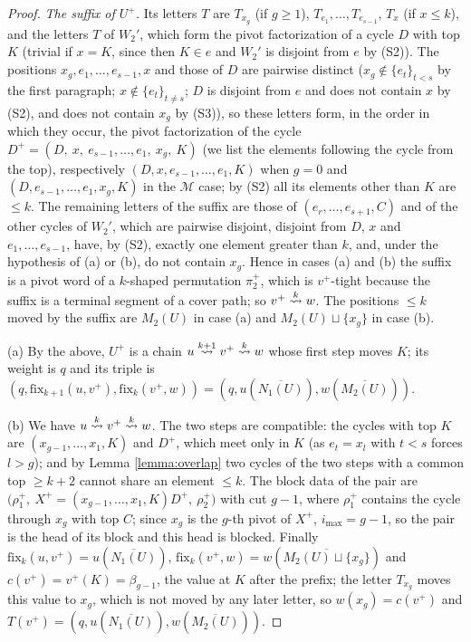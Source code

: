 \documentclass{amsart}
\theoremstyle{definition}
\theoremstyle{remark}
\numberwithin{equation}{section}
\newcommand{\xrightsquigarrow}[2][]{%
	\mathrel{\mathop{\rightsquigarrow}\limits^{\scriptstyle #2}%
	\ifx\hfuzz#1\hfuzz\else_{\scriptstyle #1}\fi}%
}
\newcommand{\tom}[1]{\ensuremath{\xrightsquigarrow{#1}}}
\newcommand{\fx}{\mathrm{fix}}
\begin{document}
\begin{proof}
\emph{The suffix of $U^+$.} Its letters $T$ are $T_{x_g}$ (if $g\geq1$), $T_{e_1},\ldots,T_{e_{s-1}}$, $T_x$ (if $x\leq k$), and the letters $T$ of $W_2'$, which form the pivot factorization of a cycle $D$ with top $K$ (trivial if $x=K$, since then $K\in e$ and $W_2'$ is disjoint from $e$ by (S2)). The positions $x_g,e_1,\ldots,e_{s-1},x$ and those of $D$ are pairwise distinct ($x_g\notin\{e_t\}_{t<s}$ by the first paragraph; $x\notin\{e_t\}_{t\neq s}$; $D$ is disjoint from $e$ and does not contain $x$ by (S2), and does not contain $x_g$ by (S3)), so these letters form, in the order in which they occur, the pivot factorization of the cycle $D^+=(D,\ x,\ e_{s-1},\ldots,e_1,\ x_g,\ K)$ (we list the elements following the cycle from the top), respectively $(D,x,e_{s-1},\ldots,e_1,K)$ when $g=0$ and $(D,e_{s-1},\ldots,e_1,x_g,K)$ in the $\mathcal M$ case; by (S2) all its elements other than $K$ are $\leq k$. The remaining letters of the suffix are those of $(e_r,\ldots,e_{s+1},C)$ and of the other cycles of $W_2'$, which are pairwise disjoint, disjoint from $D$, $x$ and $e_1,\ldots,e_{s-1}$, have, by (S2), exactly one element greater than $k$, and, under the hypothesis of (a) or (b), do not contain $x_g$. Hence in cases (a) and (b) the suffix is a pivot word of a $k$-shaped permutation $\pi_2^+$, which is $v^+$-tight because the suffix is a terminal segment of a cover path; so $v^+\tom{k}w$. The positions $\leq k$ moved by the suffix are $M_2(U)$ in case (a) and $M_2(U)\sqcup\{x_g\}$ in case (b).

(a) By the above, $U^+$ is a chain $u\tom{k+1}v^+\tom{k}w$ whose first step moves $K$; its weight is $q$ and its triple is $(q,\fx_{k+1}(u,v^+),\fx_k(v^+,w))=(q,u(\overline{N_1(U)}),w(\overline{M_2(U)}))$.

(b) We have $u\tom{k}v^+\tom{k}w$. The two steps are compatible: the cycles with top $K$ are $(x_{g-1},\ldots,x_1,K)$ and $D^+$, which meet only in $K$ (as $e_t=x_l$ with $t<s$ forces $l>g$); and by Lemma \ref{lemma:overlap} two cycles of the two steps with a common top $\geq k+2$ cannot share an element $\leq k$. The block data of the pair are $\big(\rho_1^+,\ X^+=(x_{g-1},\ldots,x_1,K)D^+,\ \rho_2^+\big)$ with cut $g-1$, where $\rho_1^+$ contains the cycle through $x_g$ with top $C$; since $x_g$ is the $g$-th pivot of $X^+$, $i_{\max}=g-1$, so the pair is the head of its block and this head is blocked. Finally $\fx_k(u,v^+)=u(\overline{N_1(U)})$, $\fx_k(v^+,w)=w(\overline{M_2(U)\sqcup\{x_g\}})$ and $c(v^+)=v^+(K)=\beta_{g-1}$, the value at $K$ after the prefix; the letter $T_{x_g}$ moves this value to $x_g$, which is not moved by any later letter, so $w(x_g)=c(v^+)$ and $T(v^+)=(q,u(\overline{N_1(U)}),w(\overline{M_2(U)}))$.


\end{proof}
\end{document}
